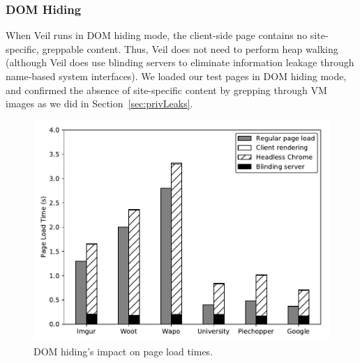 
\subsubsection{DOM Hiding}
\label{sec:dhEval}

When Veil runs in DOM hiding mode, the client-side page
contains no site-specific, greppable content. Thus,
Veil does not need to perform heap walking (although
Veil does use blinding servers to eliminate information
leakage through name-based system interfaces). We loaded
our test pages in DOM hiding mode, and confirmed the absence
of site-specific content by grepping through VM images as
we did in Section~\ref{sec:privLeaks}. 

\begin{figure}
	\centering
	\includegraphics[width=\textwidth]{veil-figs/domhiding_loadtime.pdf}
	\caption{DOM hiding's impact on page load times.}
	\label{fig:dhPageLoad}
\end{figure}

